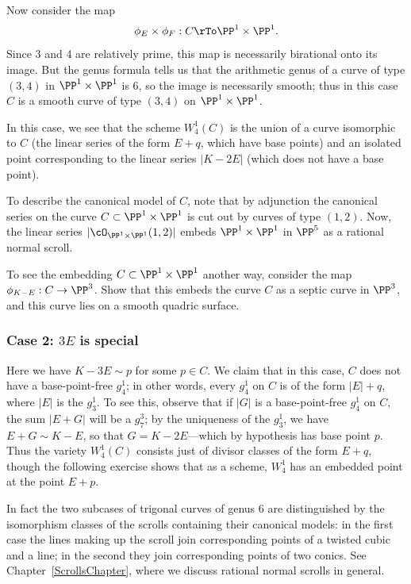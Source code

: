 Now consider the map
$$
\phi_E \times \phi_F : C \rTo \PP^1 \times \PP^1.
$$
Since 3 and 4 are relatively prime, this map is necessarily birational onto its image. But the genus formula tells us that the arithmetic genus of a curve of type $(3,4)$ in $\PP^1 \times \PP^1$ is 6, so the image is necessarily smooth; thus in this case $C$ is a smooth curve of type $(3,4)$ on $\PP^1 \times \PP^1$.

In this case, we see that the scheme $W^1_4(C)$ is the union of a curve isomorphic to $C$ (the linear series of the form $E + q$, which have base points) and an isolated point corresponding to the linear series $|K - 2E|$ (which does not have a base point).

To describe the canonical model of $C$, note that by adjunction the canonical series on the curve $C \subset \PP^1 \times \PP^1$ is cut out by curves of type $(1,2)$. Now, the linear series $|\cO_{\PP^1 \times \PP^1}(1,2)|$ embeds $\PP^1 \times \PP^1$ in $\PP^5$ as a rational normal scroll.

\begin{exercise}
To see the embedding $C \subset \PP^1 \times \PP^1$ another way, consider the map $\phi_{K-E} : C \to \PP^3$. Show that this embeds the curve $C$ as a septic curve in $\PP^3$, and this curve lies on a smooth quadric surface.
\end{exercise}

\subsubsection{Case 2: $3E$ is special}  Here we have $K - 3E \sim p$ for some $p \in C$. We claim that in this case, $C$ does not have a base-point-free $g^1_4$; in other words, every $g^1_4$ on $C$ is of the form $|E| + q$, where $|E|$ is the $g^1_3$. To see this, observe that if $|G|$ is a base-point-free $g^1_4$ on $C$, the sum $|E+G|$ will be a $g^3_7$; by the uniqueness of the $g^1_3$, we have $E+G \sim K - E$, so that $G = K-2E$---which by hypothesis has base point $p$. Thus the variety $W^1_4(C)$ consists just of divisor classes of the form $E+q$, though the following exercise shows that as a scheme, $W^1_4$ has an embedded point at the point $E+p$.

In fact  the two subcases of trigonal curves of genus 6 are distinguished by the isomorphism classes of the scrolls containing their canonical models: in the first case the lines making up the scroll join corresponding points of a twisted
cubic and a line; in the second they join corresponding points of two conics.
See Chapter~\ref{ScrollsChapter}, where we discuss rational normal scrolls in general.

